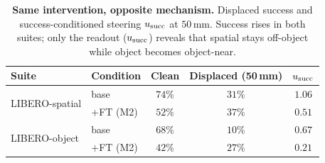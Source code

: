 \begin{table}[t]
\centering
\small
\caption{\textbf{Same intervention, opposite mechanism.} Displaced success and
success-conditioned steering $u_{\mathrm{succ}}$ at $50$\,mm. Success rises in both suites; only the
readout ($u_{\mathrm{succ}}$) reveals that spatial stays off-object while object becomes object-near.}
\label{tab:main}
\begin{tabular}{llccc}
\toprule
Suite & Condition & Clean & Displaced (50\,mm) & $u_{\mathrm{succ}}$ \\
\midrule
\multirow{2}{*}{LIBERO-spatial} & base       & $74\%$ & $31\%$ & $1.06$ \\
                                & +FT (M2)   & $52\%$ & $37\%$ & $0.51$ \\
\midrule
\multirow{2}{*}{LIBERO-object}  & base       & $68\%$ & $10\%$ & $0.67$ \\
                                & +FT (M2)   & $42\%$ & $27\%$ & $0.21$ \\
\bottomrule
\end{tabular}
\end{table}
